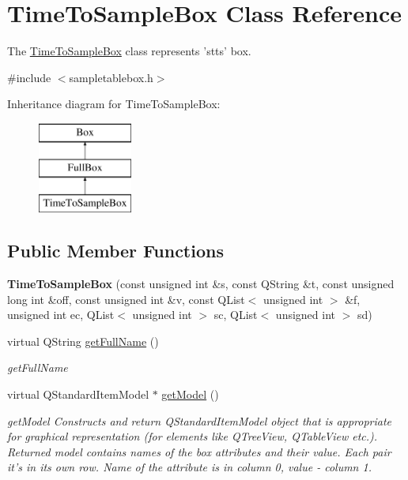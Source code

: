 \hypertarget{class_time_to_sample_box}{\section{Time\-To\-Sample\-Box Class Reference}
\label{class_time_to_sample_box}
}


The \hyperlink{class_time_to_sample_box}{Time\-To\-Sample\-Box} class represents 'stts' box.  




{\ttfamily \#include $<$sampletablebox.\-h$>$}

Inheritance diagram for Time\-To\-Sample\-Box\-:\begin{figure}[H]
\begin{center}
\leavevmode
\includegraphics[height=3.000000cm]{class_time_to_sample_box}
\end{center}
\end{figure}
\subsection*{Public Member Functions}
\begin{DoxyCompactItemize}
\item 
\hypertarget{class_time_to_sample_box_a59ef8b6303b12efea169fbc4cbfef29e}{{\bfseries Time\-To\-Sample\-Box} (const unsigned int \&s, const Q\-String \&t, const unsigned long int \&off, const unsigned int \&v, const Q\-List$<$ unsigned int $>$ \&f, unsigned int ec, Q\-List$<$ unsigned int $>$ sc, Q\-List$<$ unsigned int $>$ sd)}\label{class_time_to_sample_box_a59ef8b6303b12efea169fbc4cbfef29e}

\item 
virtual Q\-String \hyperlink{class_time_to_sample_box_a44c8086a9f61fb72f9549e8f997be7b9}{get\-Full\-Name} ()
\begin{DoxyCompactList}\small\item\em get\-Full\-Name \end{DoxyCompactList}\item 
virtual Q\-Standard\-Item\-Model $\ast$ \hyperlink{class_time_to_sample_box_a28661d2be357ba4eb02e98c5026b619d}{get\-Model} ()
\begin{DoxyCompactList}\small\item\em get\-Model Constructs and return Q\-Standard\-Item\-Model object that is appropriate for graphical representation (for elements like Q\-Tree\-View, Q\-Table\-View etc.). Returned model contains names of the box attributes and their value. Each pair it's in its own row. Name of the attribute is in column 0, value -\/ column 1. \end{DoxyCompactList}\end{DoxyCompactItemize}
